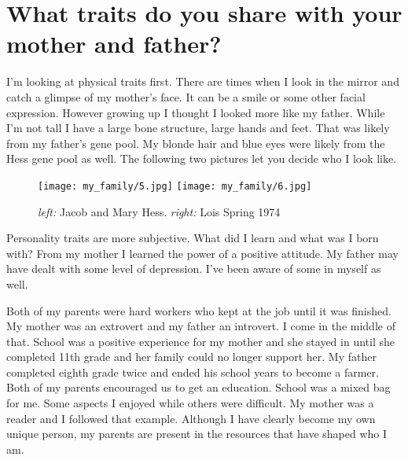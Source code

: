 \section{What traits do you share with your mother and father?}
I'm looking at physical traits first.
There are times when I look in the mirror and catch a glimpse of my mother's face.
It can be a smile or some other facial expression.
However growing up I thought I looked more like my father.
While I'm not tall I have a large bone structure, large hands and feet.
That was likely from my father's gene pool.
My blonde hair and blue eyes were likely from the Hess gene pool as well.
The following two pictures let you decide who I look like.
\begin{figure}
\centering
\texttt{[image: my\_family/5.jpg]}
\texttt{[image: my\_family/6.jpg]}
\caption{\textit{left:} Jacob and Mary Hess. \textit{right:} Lois Spring 1974}
\end{figure}


Personality traits are more subjective.
What did I learn and what was I born with? From my mother I learned the power of a positive attitude.
My father may have dealt with some level of depression.
I've been aware of some in myself as well.

Both of my parents were hard workers who kept at the job until it was finished.
My mother was an extrovert and my father an introvert.
I come in the middle of that.
School was a positive experience for my mother and she stayed in until she completed 11th grade and her family could no longer support her.
My father completed eighth grade twice and ended his school years to become a farmer.
Both of my parents encouraged us to get an education.
School was a mixed bag for me.
Some aspects I enjoyed while others were difficult.
My mother was a reader and I followed that example.
Although I have clearly become my own unique person, my parents are present in the resources that have shaped who I am.




